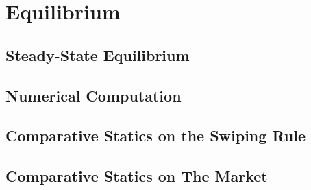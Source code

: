 \section{Equilibrium}
\subsection{Steady-State Equilibrium}
\subsection{Numerical Computation}
\subsection{Comparative Statics on the Swiping Rule}
\subsection{Comparative Statics on The Market}